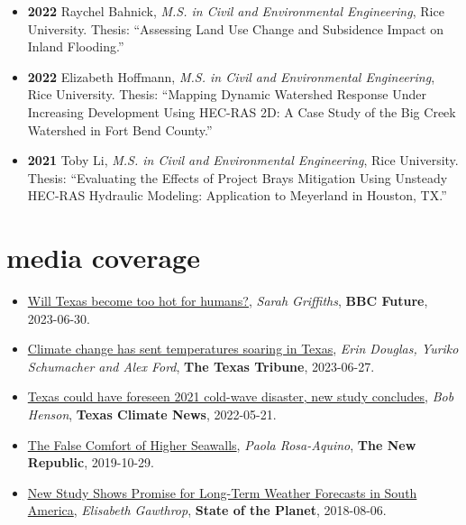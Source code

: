 \documentclass[10pt,oneside]{article}
\begin{document}
\begin{itemize}[label={}]
    \item \textbf{2022} \quad Raychel Bahnick, \textit{M.S. in Civil and Environmental Engineering}, Rice University. Thesis: \enquote{Assessing Land Use Change and Subsidence Impact on Inland Flooding.}
  
    \item \textbf{2022} \quad Elizabeth Hoffmann, \textit{M.S. in Civil and Environmental Engineering}, Rice University. Thesis: \enquote{Mapping Dynamic Watershed Response Under Increasing Development Using HEC-RAS 2D: A Case Study of the Big Creek Watershed in Fort Bend County.}
  
    \item \textbf{2021} \quad Toby Li, \textit{M.S. in Civil and Environmental Engineering}, Rice University. Thesis: \enquote{Evaluating the Effects of Project Brays Mitigation Using Unsteady HEC-RAS Hydraulic Modeling: Application to Meyerland in Houston, TX.}
  
\end{itemize}


\section{media coverage}

\mbox{}\vspace{-\dimexpr\baselineskip\relax}

\begin{itemize}[label={}]
  
  \item \href{https://www.bbc.com/future/article/20230630-will-texas-become-too-hot-for-humans}{Will Texas become too hot for humans?}, \textit{Sarah Griffiths}, \textbf{BBC Future}, 2023-06-30.
        
  \item \href{https://www.texastribune.org/2023/06/27/texas-climate-change-heat/}{Climate change has sent temperatures soaring in Texas}, \textit{Erin Douglas, Yuriko Schumacher and Alex Ford}, \textbf{The Texas Tribune}, 2023-06-27.
        
  \item \href{https://texasclimatenews.org/2022/05/21/texas-could-have-foreseen-2021-cold-wave-disaster-new-study-concludes/}{Texas could have foreseen 2021 cold-wave disaster, new study concludes}, \textit{Bob Henson}, \textbf{Texas Climate News}, 2022-05-21.
        
  \item \href{https://newrepublic.com/article/155519/false-comfort-higher-seawalls}{The False Comfort of Higher Seawalls}, \textit{Paola Rosa-Aquino}, \textbf{The New Republic}, 2019-10-29.
        
  \item \href{https://blogs.ei.columbia.edu/2018/08/06/subseasonal-weather-forecasts-paraguay/}{New Study Shows Promise for Long-Term Weather Forecasts in South America}, \textit{Elisabeth Gawthrop}, \textbf{State of the Planet}, 2018-08-06.
        
\end{itemize}
\end{document}
